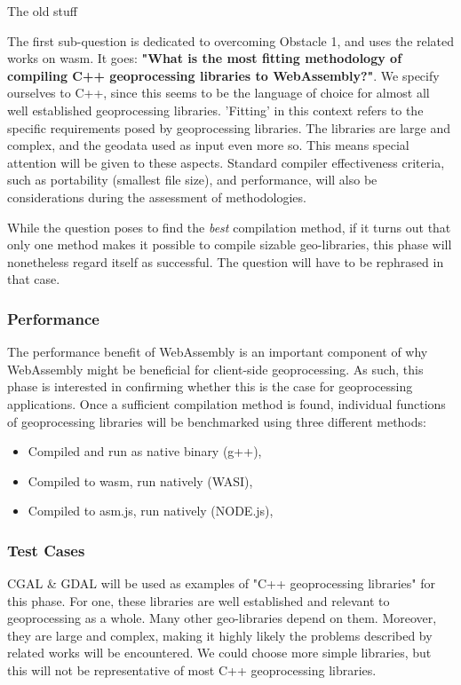 
\begin{note}
  The old stuff
\end{note}

The first sub-question is dedicated to overcoming Obstacle 1, and uses the related works on \ac{wasm}. It goes: \textbf{"What is the most fitting methodology of compiling C++ geoprocessing libraries to WebAssembly?"}.
We specify ourselves to C++, since this seems to be the language of choice for almost all well established geoprocessing libraries. 
'Fitting' in this context refers to the specific requirements posed by geoprocessing libraries. 
The libraries are large and complex, and the geodata used as input even more so. 
This means special attention will be given to these aspects. 
Standard compiler effectiveness criteria, such as portability (smallest file size), and performance, will also be considerations during the assessment of methodologies.  

While the question poses to find the \textit{best} compilation method, if it turns out that only one method makes it possible to compile sizable geo-libraries, this phase will nonetheless regard itself as successful. The question will have to be rephrased in that case. 

\subsubsection*{Performance}
The performance benefit of WebAssembly is an important component of why WebAssembly might be beneficial for client-side geoprocessing. As such, this phase is interested in confirming whether this is the case for geoprocessing applications. Once a sufficient compilation method is found, individual functions of geoprocessing libraries will be benchmarked using three different methods: 

\begin{itemize}
  \item Compiled and run as native binary (g++), 
  \item Compiled to wasm, run natively (WASI),
  \item Compiled to asm.js, run natively (NODE.js),
\end{itemize}

\subsubsection*{Test Cases}
CGAL \& GDAL will be used as examples of "C++ geoprocessing libraries" for this phase. For one, these libraries are well established and relevant to geoprocessing as a whole. Many other geo-libraries depend on them. Moreover, they are large and complex, making it highly likely the problems described by related works will be encountered. We could choose more simple libraries, but this will not be representative of most C++ geoprocessing libraries. 

